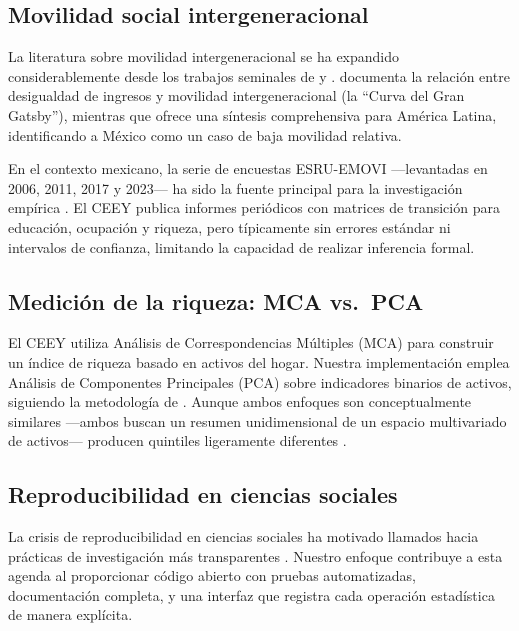 \documentclass[12pt, a4paper]{article}
\begin{document}
\subsection{Movilidad social intergeneracional}

La literatura sobre movilidad intergeneracional se ha expandido considerablemente desde los trabajos seminales de \citet{shorrocks1978} y \citet{prais1955}. \citet{corak2013} documenta la relación entre desigualdad de ingresos y movilidad intergeneracional (la ``Curva del Gran Gatsby''), mientras que \citet{torche2014} ofrece una síntesis comprehensiva para América Latina, identificando a México como un caso de baja movilidad relativa.

En el contexto mexicano, la serie de encuestas ESRU-EMOVI ---levantadas en 2006, 2011, 2017 y 2023--- ha sido la fuente principal para la investigación empírica \citep{delajara2017, ceey2025}. El CEEY publica informes periódicos con matrices de transición para educación, ocupación y riqueza, pero típicamente sin errores estándar ni intervalos de confianza, limitando la capacidad de realizar inferencia formal.

\subsection{Medición de la riqueza: MCA vs.\ PCA}

El CEEY utiliza Análisis de Correspondencias Múltiples (MCA) para construir un índice de riqueza basado en activos del hogar. Nuestra implementación emplea Análisis de Componentes Principales (PCA) sobre indicadores binarios de activos, siguiendo la metodología de \citet{filmer2001}. Aunque ambos enfoques son conceptualmente similares ---ambos buscan un resumen unidimensional de un espacio multivariado de activos--- producen quintiles ligeramente diferentes \citep{vyas2006, mckenzie2005}.

\subsection{Reproducibilidad en ciencias sociales}

La crisis de reproducibilidad en ciencias sociales ha motivado llamados hacia prácticas de investigación más transparentes \citep{christensen2018, gentzkow2014}. Nuestro enfoque contribuye a esta agenda al proporcionar código abierto con pruebas automatizadas, documentación completa, y una interfaz que registra cada operación estadística de manera explícita.
\end{document}
